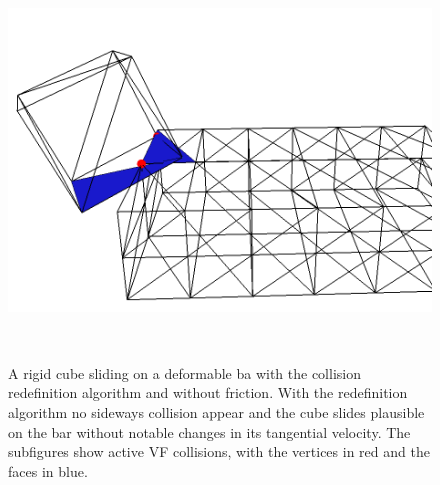 \begin{figure}[tbp]
\begin{minipage}[b]{0.3 \linewidth}
{			       \includegraphics[width=1.0\linewidth]{pics/png/redef_vf06.png} }
				\end{minipage}\\
				\caption[A rigid cube sliding on a deformable bar with the collision redefinition algorithm and without friction.]{A rigid cube sliding on a deformable ba with the collision redefinition algorithm and without friction. With the redefinition algorithm no sideways collision appear and the cube slides plausible on the bar without notable changes in its tangential velocity. The subfigures show active VF collisions, with the vertices in red and the faces in blue.}
				\label{fig::redef_collsVF}
\end{figure}

